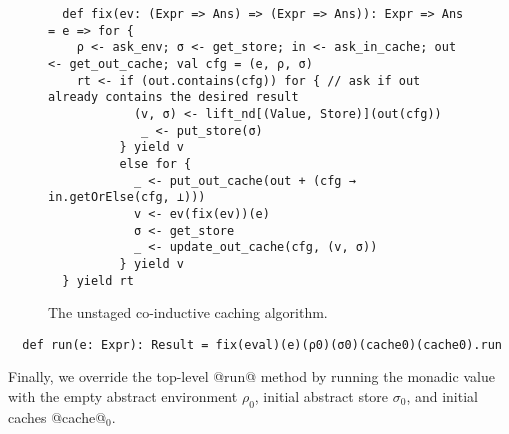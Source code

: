\begin{figure}[h!]
  \centering
\begin{lstlisting}
  def fix(ev: (Expr => Ans) => (Expr => Ans)): Expr => Ans = e => for {
    ρ <- ask_env; σ <- get_store; in <- ask_in_cache; out <- get_out_cache; val cfg = (e, ρ, σ)
    rt <- if (out.contains(cfg)) for { // ask if out already contains the desired result
            (v, σ) <- lift_nd[(Value, Store)](out(cfg))
             _ <- put_store(σ)
          } yield v
          else for {
            _ <- put_out_cache(out + (cfg → in.getOrElse(cfg, ⊥)))
            v <- ev(fix(ev))(e)
            σ <- get_store
            _ <- update_out_cache(cfg, (v, σ))
          } yield v
  } yield rt
\end{lstlisting}
\vspace{-1em}
\caption{The unstaged co-inductive caching algorithm.}
\label{fig:coind_cache}
\end{figure}

\begin{lstlisting}
  def run(e: Expr): Result = fix(eval)(e)(ρ0)(σ0)(cache0)(cache0).run
\end{lstlisting}

Finally, we override the top-level @run@ method by running the monadic value
with the empty abstract environment $\rho_0$, initial abstract store $\sigma_0$,
and initial caches @cache@$_0$.
